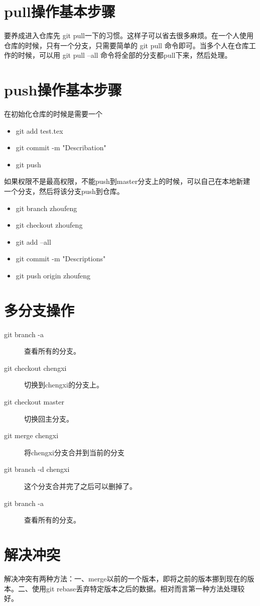 \documentclass[a4paper,12pt]{ctexart}
\begin{document}
\newpage
\section{pull操作基本步骤}
要养成进入仓库先 git pull一下的习惯。这样子可以省去很多麻烦。在一个人使用仓库的时候，只有一个分支，只需要简单的 git pull 命令即可。当多个人在仓库工作的时候，可以用 git pull --all 命令将全部的分支都pull下来，然后处理。

\newpage
\section{push操作基本步骤}
在初始化仓库的时候是需要一个
\begin{itemize}
   \item git add test.tex
   \item git commit -m "Describation"
   \item git push
\end{itemize}
如果权限不是最高权限，不能push到master分支上的时候，可以自己在本地新建一个分支，然后将该分支push到仓库。
\begin{itemize}
  \item git branch zhoufeng
  \item git checkout zhoufeng
  \item git add --all
  \item git commit -m "Descriptions"
  \item git push origin zhoufeng
\end{itemize}

\section{多分支操作}
\begin{description}
  \item[git branch -a]  查看所有的分支。
  \item[git checkout chengxi]   切换到chengxi的分支上。
  \item[git checkout master]    切换回主分支。
  \item[git merge chengxi]  将chengxi分支合并到当前的分支
  \item[git branch -d chengxi]  这个分支合并完了之后可以删掉了。
  \item[git branch -a]  查看所有的分支。
\end{description}

\section{解决冲突}
解决冲突有两种方法：一、merge以前的一个版本，即将之前的版本挪到现在的版本。二、使用git rebase丢弃特定版本之后的数据。相对而言第一种方法处理较好。
\end{document}
